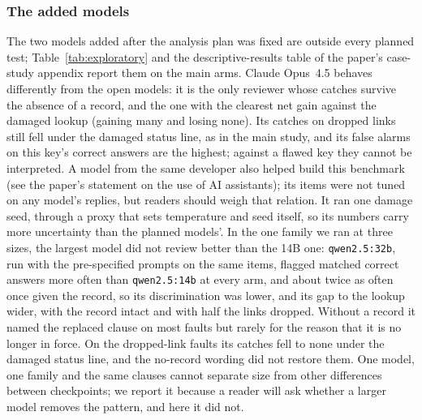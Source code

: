 \subsubsection{The added models}
\label{sec:res-explore}
The two models added after the analysis plan was fixed are outside every planned test; Table~\ref{tab:exploratory}
and the descriptive-results table of the paper's case-study appendix report them on the main arms. Claude Opus~4.5
behaves differently from the open models: it is the only reviewer whose catches survive the absence of a record, and
the one with the clearest net gain against the damaged lookup (gaining many and losing none). Its catches on dropped links still
fell under the damaged status line, as in the main study, and its false alarms on this key's correct answers are
the highest; against a flawed key they cannot be interpreted. A model from the same developer also helped build this
benchmark (see the paper's statement on the use of AI assistants); its items were not tuned on any model's replies,
but readers should weigh that relation. It ran one damage seed, through a
proxy that sets temperature and seed itself, so its numbers carry more uncertainty than the planned models'. In the one family we ran at three sizes, the largest model did not review better than the 14B one: \texttt{qwen2.5:32b}, run with
the pre-specified prompts on the same items, flagged matched correct answers more often than
\texttt{qwen2.5:14b} at every arm, and about twice as often once given the record, so its discrimination was lower, and its gap to the lookup wider, with the record
intact and with half the links dropped. Without a record it named the replaced clause on most faults but rarely for
the reason that it is no longer in force. On the dropped-link faults its catches fell to none under the damaged
status line, and the no-record wording did not restore them. One model, one family and the same \NClauses{} clauses
cannot separate size from other differences between checkpoints; we report it because a reader will ask whether a
larger model removes the pattern, and here it did not.

